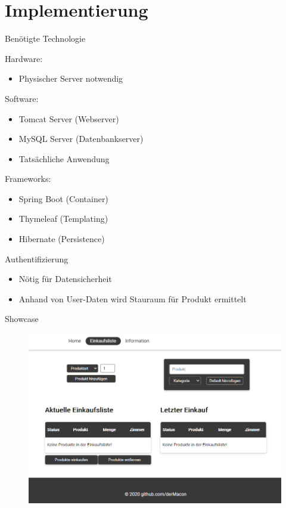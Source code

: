 \section{Implementierung}

\begin{frame}{Benötigte Technologie}

Hardware:
\begin{itemize}
\item Physischer Server notwendig
\end{itemize}

Software:
\begin{itemize}
\item Tomcat Server (Webserver)
\item MySQL Server (Datenbankserver)
\item Tatsächliche Anwendung
\end{itemize}

Frameworks:
\begin{itemize}
\item Spring Boot (Container)\\
\item Thymeleaf (Templating)
\item Hibernate (Persistence)
\end{itemize}

\end{frame}


\begin{frame}{Authentifizierung}

\begin{itemize}
\item Nötig für Datensicherheit
\item Anhand von User-Daten wird Stauraum für Produkt ermittelt

\end{itemize}

\end{frame}


\begin{frame}{Showcase}

\begin{figure}
\includegraphics[width=.9\linewidth]{./_img/screenshot_01}
\end{figure}

\end{frame}






